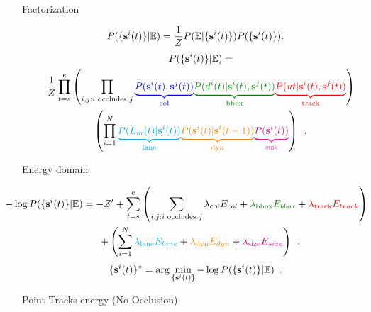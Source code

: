 \begin{frame}{Factorization}

\begin{align*}
  P(\{\mathbf{s}^{i}(t)\} | \mathbb{E}) =
  \frac{1}{Z}P( \mathbb{E} | \{\mathbf{s}^{i}(t)\})P(\{\mathbf{s}^{i}(t)\})&.
\end{align*}
\begin{multline*}
  P(\{\state{i}{t}\} | \mathbb{E}) = \\
  \frac{1}{Z}
  \prod_{t=s}^{e}
  \left(
    \prod_{i,j: i \text{ occludes } j}
    {\colcol\underbrace{P(\state{i}{t}, \state{j}{t})}_{\text{col}}}
    {\colbbox\underbrace{P(\bb{i} | \state{i}{t}, \state{j}{t})}_{\text{bbox}}}
    {\coltrack\underbrace{P(\trackp{t} | \state{i}{t}, \state{j}{t})}_{\text{track}}}
\right)
\\
\left(
  \prod_{i=1}^{N}
  {\collane\underbrace{P(L_m(t) | \state{i}{t})}_{\text{lane}}}
  {\coldyn\underbrace{P(\state{i}{t} | \state{i}{t-1})}_{\text{dyn}}}
  {\colsize\underbrace{P(\state{i}{t})}_{\text{size}}}
\right)
  \enspace .
\end{multline*}
%

\end{frame}


\begin{frame}{Energy domain}

\begin{multline*}
  \hspace{-1cm}
  -\log{P(\{\state{i}{t}\} | \mathbb{E})} = 
  -Z' 
  + \sum_{t=s}^{e}
  \left(
    \sum_{i,j:i \text{ occludes } j}   
  \WEnergyCol 
   + \WEnergyBBox
   + \WEnergyTrack
\right)
  \\
  + \left(
  \sum_{i=1}^N 
  \WEnergyLane
  + \WEnergyDyn
  + \WEnergySize
\right)
  \enspace.
\end{multline*}
\begin{align*}
  \{\mathbf{s}^{i}(t)\}^* &= \arg \min_{\{\mathbf{s}^{i}(t)\}} - \log P(\{\mathbf{s}^{i}(t)\} | \mathbb{E})\enspace.
\end{align*}
  
\end{frame}

\begin{frame}{Point Tracks energy (No Occlusion)}
  \centering
  \begin{figure}
  
  \end{figure}
\end{frame}

